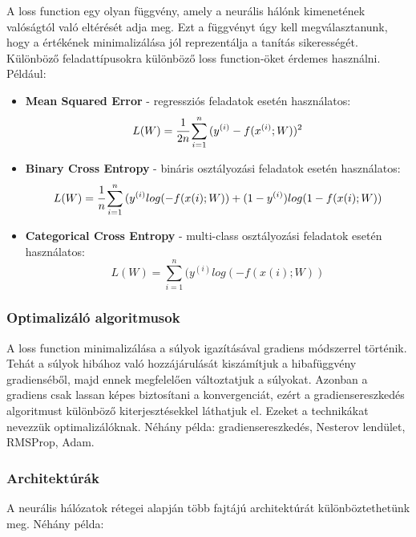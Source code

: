 A loss function egy olyan függvény, amely a neurális hálónk kimenetének valóságtól való eltérését adja meg. Ezt a függvényt úgy kell megválasztanunk, hogy a értékének minimalizálása jól reprezentálja a tanítás sikerességét. Különböző feladattípusokra különböző loss function-öket érdemes használni. Például:
\begin{itemize}
 \item \textbf{Mean Squared Error} - regressziós feladatok esetén használatos:
\begin{equation}
	L(W) = \cfrac{1}{2n}\sum_{i=1}^{n}{(y^{(i)}-f(x^{(i)};W))^2}
\end{equation}
 \item \textbf{Binary Cross Entropy} - bináris osztályozási feladatok esetén használatos:
\begin{equation}
	L(W) = \cfrac{1}{n}\sum_{i=1}^{n}{(y^{(i)}log(-f(x{(i)};W))+(1-y^{(i)})log(1-f(x{(i)};W))}
\end{equation}
 \item \textbf{Categorical Cross Entropy} - multi-class osztályozási feladatok esetén használatos: \cite{deeplearningbook}
\begin{equation}
	L(W) = \sum_{i=1}^{n}{(y^{(i)}log(-f(x{(i)};W))}
\end{equation}
 \end{itemize}

\subsubsection{Optimalizáló algoritmusok}

A loss function minimalizálása a súlyok igazításával gradiens módszerrel történik. Tehát a súlyok hibához való hozzájárulását kiszámítjuk a hibafüggvény gradienséből, majd ennek megfelelően változtatjuk a súlyokat. Azonban a gradiens csak lassan képes biztosítani a konvergenciát, ezért a gradiensereszkedés algoritmust különböző kiterjesztésekkel láthatjuk el. Ezeket a technikákat nevezzük optimalizálóknak. Néhány példa: gradiensereszkedés, Nesterov lendület, RMSProp, Adam. \cite{deeplearningbook}

\subsubsection{Architektúrák}

A neurális hálózatok rétegei alapján több fajtájú architektúrát különböztethetünk meg. Néhány példa:

